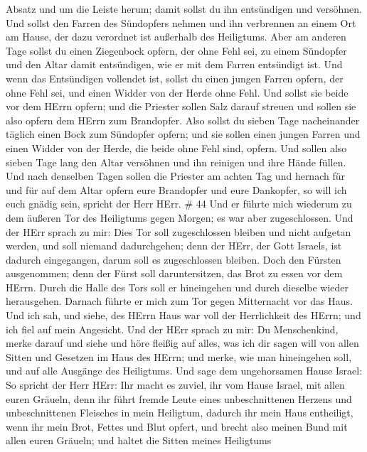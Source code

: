 Absatz und um die Leiste herum; damit sollst du ihn entsündigen und
versöhnen.  Und sollst den Farren des Sündopfers nehmen und
ihn verbrennen an einem Ort am Hause, der dazu verordnet ist außerhalb
des Heiligtums.  Aber am anderen Tage sollst du einen
Ziegenbock opfern, der ohne Fehl sei, zu einem Sündopfer und den Altar
damit entsündigen, wie er mit dem Farren entsündigt ist. 
Und wenn das Entsündigen vollendet ist, sollst du einen jungen Farren
opfern, der ohne Fehl sei, und einen Widder von der Herde ohne Fehl.
 Und sollst sie beide vor dem HErrn opfern; und die
Priester sollen Salz darauf streuen und sollen sie also opfern dem HErrn
zum Brandopfer.  Also sollst du sieben Tage nacheinander
täglich einen Bock zum Sündopfer opfern; und sie sollen einen jungen
Farren und einen Widder von der Herde, die beide ohne Fehl sind, opfern.
 Und sollen also sieben Tage lang den Altar versöhnen und
ihn reinigen und ihre Hände füllen.  Und nach denselben
Tagen sollen die Priester am achten Tag und hernach für und für auf dem
Altar opfern eure Brandopfer und eure Dankopfer, so will ich euch gnädig
sein, spricht der Herr HErr. \# 44  Und er führte mich
wiederum zu dem äußeren Tor des Heiligtums gegen Morgen; es war aber
zugeschlossen.  Und der HErr sprach zu mir: Dies Tor soll
zugeschlossen bleiben und nicht aufgetan werden, und soll niemand
dadurchgehen; denn der HErr, der Gott Israels, ist dadurch eingegangen,
darum soll es zugeschlossen bleiben.  Doch den Fürsten
ausgenommen; denn der Fürst soll daruntersitzen, das Brot zu essen vor
dem HErrn. Durch die Halle des Tors soll er hineingehen und durch
dieselbe wieder herausgehen.  Darnach führte er mich zum Tor
gegen Mitternacht vor das Haus. Und ich sah, und siehe, des HErrn Haus
war voll der Herrlichkeit des HErrn; und ich fiel auf mein Angesicht.
 Und der HErr sprach zu mir: Du Menschenkind, merke darauf
und siehe und höre fleißig auf alles, was ich dir sagen will von allen
Sitten und Gesetzen im Haus des HErrn; und merke, wie man hineingehen
soll, und auf alle Ausgänge des Heiligtums.  Und sage dem
ungehorsamen Hause Israel: So spricht der Herr HErr: Ihr macht es
zuviel, ihr vom Hause Israel, mit allen euren Gräueln,  denn
ihr führt fremde Leute eines unbeschnittenen Herzens und unbeschnittenen
Fleisches in mein Heiligtum, dadurch ihr mein Haus entheiligt, wenn ihr
mein Brot, Fettes und Blut opfert, und brecht also meinen Bund mit allen
euren Gräueln;  und haltet die Sitten meines Heiligtums
